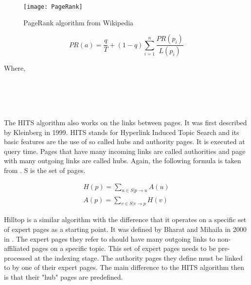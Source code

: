 \begin{figure}[!htb] %
\centering
\texttt{[image: PageRank]}
\caption[PageRank algorithm]{PageRank algorithm from Wikipedia}
\label{fig:pagerank}
\end{figure}

\begin{equation}
PR\left(a\right) =
\frac{q}{T} + \left(1 - q\right)
\sum_{i=1}^{n} \frac{PR\left(p_i\right)}{L\left(p_i\right)}
\end{equation}

Where,\\
 \\
 \\
 \\
 \\
\itab{} 

The HITS algorithm also works on the links between pages. It was first described by Kleinberg \citep[p.472]{Kleinberg1999, Kleinberg} in 1999. HITS stands for Hyperlink Induced Topic Search and its basic features are the use of so called hubs and authority pages. It is executed at query time. Pages that have many incoming links are called authorities and page with many outgoing links are called hubs. Again, the following formula is taken from \citep[p.471]{Baeza-Yates2011}. S is the set of pages.

\begin{align}
H\left(p \right) = \sum_{u\in S | p\to u}A\left(u  \right)\\
A\left(p \right) = \sum_{v\in S | v\to p}H\left(v  \right)
\end{align}

Hilltop is a similar algorithm with the difference that it operates on a specific set of expert pages as a starting point. It was defined by Bharat and Mihaila in 2000 in \citep{Bharat2000}. The expert pages they refer to should have many outgoing links to non-affiliated pages on a specific topic. This set of expert pages needs to be pre-processed at the indexing stage. The authority pages they define must be linked to by one of their expert pages. The main difference to the HITS algorithm then is that their "hub" pages are predefined.

